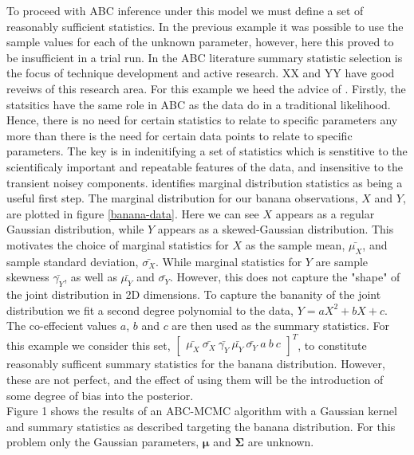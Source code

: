 To proceed with ABC inference under this model we must define a set of reasonably sufficient statistics. In the previous example it was possible to use the sample values for each of the unknown parameter, however, here this proved to be insufficient in a trial run. In the ABC literature summary statistic selection is the focus of technique development and active research. XX and YY have good reveiws of this research area. For this example we heed the advice of \citet{Wood2010}. Firstly, the statsitics have the same role in ABC as the data do in a traditional likelihood. Hence, there is no need for certain statistics to relate to specific parameters any more than there is the need for certain data points to relate to specific parameters. The key is in indenitifying a set of statistics which is senstitive to the scientificaly important and repeatable features of the data, and insensitive to the transient noisey components. \citet{Wood2010} identifies marginal distribution statistics as being a useful first step. The marginal distribution for our banana observations, $X$ and $Y$, are plotted in figure \ref{banana-data}. Here we can see $X$ appears as a regular Gaussian distribution, while $Y$ appears as a skewed-Gaussian distribution. This motivates the choice of marginal statistics for $X$ as the sample mean, $\bar{\mu_X}$, and sample standard deviation, $\bar{\sigma_X}$. While marginal statistics for $Y$ are sample skewness $\bar{\gamma_Y}$, as well as $\bar{\mu_Y}$ and $\bar{\sigma_Y}$. However, this does not capture the "shape" of the joint distribution in 2D dimensions. To capture the bananity of the joint distribution we fit a second degree polynomial to the data, $Y = aX^2 + bX + c$. The co-effecient values $a$, $b$ and $c$ are then used as the summary statistics. For this example we consider this set, $\begin{bmatrix}
\bar{\mu_X}\ \bar{\sigma_X}\ \bar{\gamma_Y}\ \bar{\mu_Y}\ \bar{\sigma_Y}\ a\ b\ c
\end{bmatrix}^T$, to constitute reasonably sufficent summary statistics for the banana distribution. However, these are not perfect, and the effect of using them will be the introduction of some degree of bias into the posterior. \\

Figure 1 shows the results of an ABC-MCMC algorithm with a Gaussian kernel and summary statistics as described targeting the banana distribution. For this problem only the Gaussian parameters, $\bm{\mu}$ and $\bm{\Sigma}$ are unknown.

